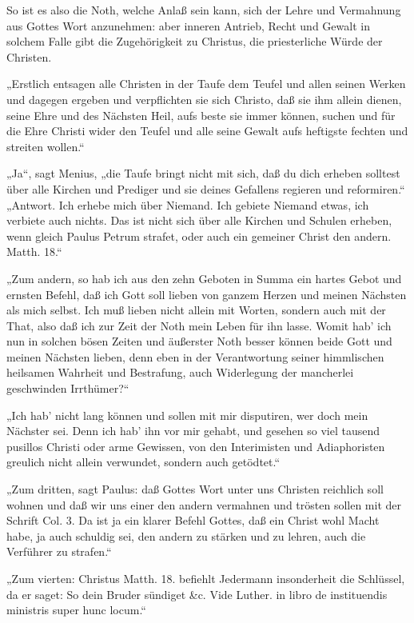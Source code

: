 So ist es also die Noth, welche Anlaß sein kann, sich der Lehre und Vermahnung aus Gottes Wort anzunehmen: aber
inneren Antrieb, Recht und Gewalt in solchem Falle gibt die Zugehörigkeit zu Christus, die priesterliche Würde
der Christen.

„Erstlich entsagen alle Christen in der Taufe dem Teufel und allen seinen Werken und dagegen ergeben und verpflichten
sie sich Christo, daß sie ihm allein dienen, seine Ehre und des Nächsten Heil, aufs beste sie immer können,
suchen und für die Ehre Christi wider den Teufel und alle seine Gewalt aufs heftigste fechten und streiten wollen.“

„Ja“, sagt Menius, „die Taufe bringt nicht mit sich, daß du dich erheben solltest über alle Kirchen und
Prediger und sie deines Gefallens regieren und reformiren.“
„Antwort. Ich erhebe mich über Niemand. Ich gebiete Niemand etwas, ich verbiete auch nichts. Das ist nicht
sich über alle Kirchen und Schulen erheben, wenn gleich Paulus Petrum strafet, oder auch ein gemeiner Christ den
andern. Matth. 18.“

„Zum andern, so hab ich aus den zehn Geboten in Summa ein hartes Gebot und ernsten Befehl, daß ich Gott soll
lieben von ganzem Herzen und meinen Nächsten als mich selbst. Ich muß lieben nicht allein mit Worten, sondern auch
mit der That, also daß ich zur Zeit der Noth mein Leben für ihn lasse. Womit hab’ ich nun in solchen bösen
Zeiten und äußerster Noth besser können beide Gott und meinen Nächsten lieben, denn eben in der Verantwortung
seiner himmlischen heilsamen Wahrheit und Bestrafung, auch Widerlegung der mancherlei geschwinden Irrthümer?“

„Ich hab’ nicht lang können und sollen mit mir disputiren, wer doch mein Nächster sei. Denn ich hab’
ihn vor mir gehabt, und gesehen so viel tausend pusillos Christi oder arme Gewissen, von den Interimisten und
Adiaphoristen greulich nicht allein verwundet, sondern auch getödtet.“

„Zum dritten, sagt Paulus: daß Gottes Wort unter uns Christen reichlich soll wohnen und daß wir uns einer den
andern vermahnen und trösten sollen mit der Schrift Col. 3. Da ist ja ein klarer Befehl Gottes, daß ein Christ
wohl Macht habe, ja auch schuldig sei, den andern zu stärken und zu lehren, auch die Verführer zu strafen.“

„Zum vierten: Christus Matth. 18. befiehlt Jedermann insonderheit die Schlüssel, da er saget: So dein Bruder
sündiget \&c. Vide Luther. in libro de instituendis ministris super hunc locum.“

